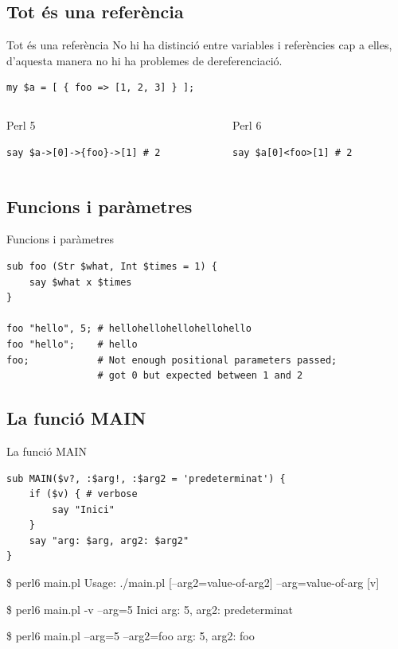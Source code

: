 \documentclass{beamer}
\begin{document}
			\subsection{Tot és una referència}
\begin{frame}[fragile]{Tot és una referència}
	No hi ha distinció entre variables i referències cap a elles,
    d'aquesta manera no hi ha problemes de dereferenciació.
	\begin{verbatim}
my $a = [ { foo => [1, 2, 3] } ];
	\end{verbatim}
	\begin{columns}[t]
		\begin{column}{0.5\textwidth}
			\begin{block}{Perl 5}
				\begin{verbatim}
say $a->[0]->{foo}->[1] # 2
				\end{verbatim}
			\end{block}
		\end{column}
		\begin{column}{0.5\textwidth}
			\begin{block}{Perl 6}
				\begin{verbatim}
say $a[0]<foo>[1] # 2
				\end{verbatim}
			\end{block}
		\end{column}
	\end{columns}
\end{frame}
			\subsection{Funcions i paràmetres}
\begin{frame}[fragile]{Funcions i paràmetres}
	\begin{verbatim}
sub foo (Str $what, Int $times = 1) {
    say $what x $times
}

foo "hello", 5; # hellohellohellohellohello
foo "hello";    # hello
foo;            # Not enough positional parameters passed;
                # got 0 but expected between 1 and 2
	\end{verbatim}
\end{frame}
			\subsection{La funció MAIN}
\begin{frame}[fragile]{La funció MAIN}
\small
\begin{verbatim}
sub MAIN($v?, :$arg!, :$arg2 = 'predeterminat') {
    if ($v) { # verbose
        say "Inici"
    }
    say "arg: $arg, arg2: $arg2"
}
\end{verbatim}
\begin{semiverbatim}
\$ \alert{perl6 main.pl}
Usage:
./main.pl [--arg2=value-of-arg2] --arg=value-of-arg [v]

\$ \alert{perl6 main.pl -v --arg=5}
Inici
arg: 5, arg2: predeterminat

\$ \alert{perl6 main.pl --arg=5 --arg2=foo}
arg: 5, arg2: foo
\end{semiverbatim}
\end{frame}
\end{document}
